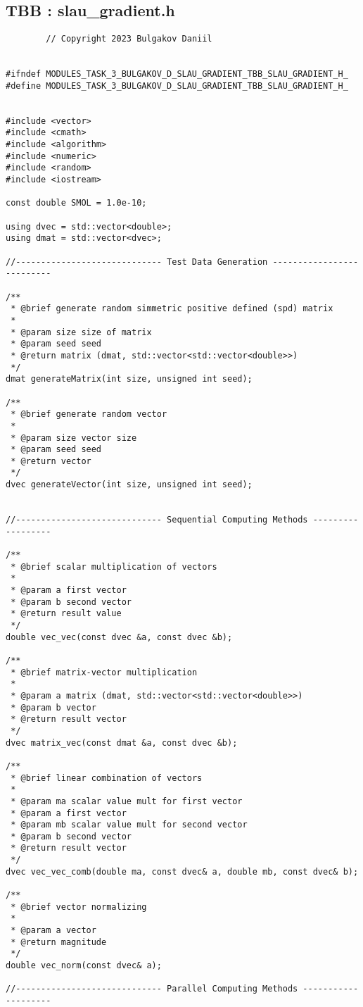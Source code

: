 \documentclass[14pt, russian]{extarticle}
\begin{document}
        \subsection{TBB : slau\_gradient.h}
        \begin{lstlisting}
        // Copyright 2023 Bulgakov Daniil


#ifndef MODULES_TASK_3_BULGAKOV_D_SLAU_GRADIENT_TBB_SLAU_GRADIENT_H_
#define MODULES_TASK_3_BULGAKOV_D_SLAU_GRADIENT_TBB_SLAU_GRADIENT_H_


#include <vector>
#include <cmath>
#include <algorithm>
#include <numeric>
#include <random>
#include <iostream>

const double SMOL = 1.0e-10;

using dvec = std::vector<double>;
using dmat = std::vector<dvec>;

//----------------------------- Test Data Generation --------------------------

/**
 * @brief generate random simmetric positive defined (spd) matrix
 * 
 * @param size size of matrix
 * @param seed seed
 * @return matrix (dmat, std::vector<std::vector<double>>)
 */
dmat generateMatrix(int size, unsigned int seed);

/**
 * @brief generate random vector
 * 
 * @param size vector size
 * @param seed seed
 * @return vector
 */
dvec generateVector(int size, unsigned int seed);


//----------------------------- Sequential Computing Methods ------------------

/**
 * @brief scalar multiplication of vectors
 * 
 * @param a first vector
 * @param b second vector
 * @return result value 
 */
double vec_vec(const dvec &a, const dvec &b);

/**
 * @brief matrix-vector multiplication
 * 
 * @param a matrix (dmat, std::vector<std::vector<double>>)
 * @param b vector
 * @return result vector
 */
dvec matrix_vec(const dmat &a, const dvec &b);

/**
 * @brief linear combination of vectors
 * 
 * @param ma scalar value mult for first vector
 * @param a first vector
 * @param mb scalar value mult for second vector
 * @param b second vector
 * @return result vector
 */
dvec vec_vec_comb(double ma, const dvec& a, double mb, const dvec& b);

/**
 * @brief vector normalizing
 * 
 * @param a vector
 * @return magnitude 
 */
double vec_norm(const dvec& a);

//----------------------------- Parallel Computing Methods --------------------


\end{lstlisting}
\end{document}
